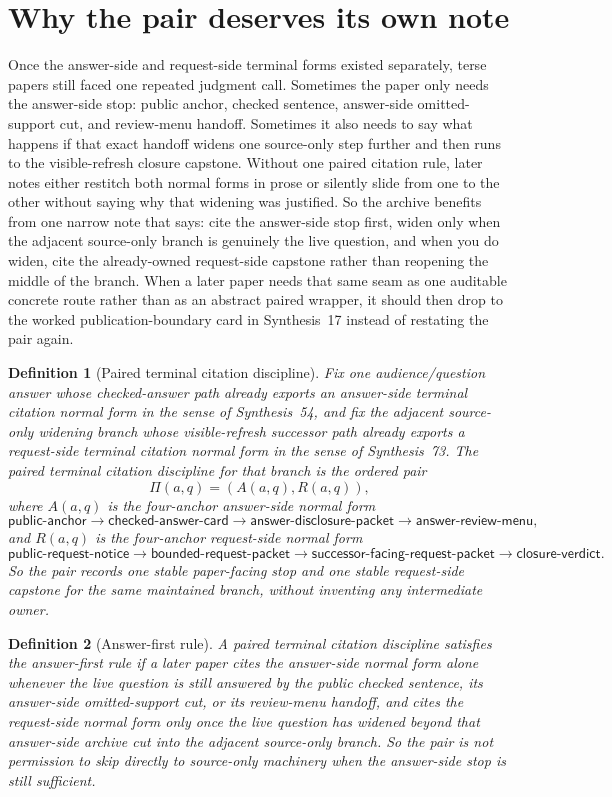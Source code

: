 \documentclass[11pt]{article}
\newtheorem{definition}{Definition}
\begin{document}
\section{Why the pair deserves its own note}
Once the answer-side and request-side terminal forms existed separately, terse papers still faced one repeated judgment call.
Sometimes the paper only needs the answer-side stop: public anchor, checked sentence, answer-side omitted-support cut, and review-menu handoff.
Sometimes it also needs to say what happens if that exact handoff widens one source-only step further and then runs to the visible-refresh closure capstone.
Without one paired citation rule, later notes either restitch both normal forms in prose or silently slide from one to the other without saying why that widening was justified.
So the archive benefits from one narrow note that says: cite the answer-side stop first, widen only when the adjacent source-only branch is genuinely the live question, and when you do widen, cite the already-owned request-side capstone rather than reopening the middle of the branch. When a later paper needs that same seam as one auditable concrete route rather than as an abstract paired wrapper, it should then drop to the worked publication-boundary card in Synthesis~17 instead of restating the pair again.

\begin{definition}[Paired terminal citation discipline]
Fix one audience/question answer whose checked-answer path already exports an answer-side terminal citation normal form in the sense of Synthesis~54, and fix the adjacent source-only widening branch whose visible-refresh successor path already exports a request-side terminal citation normal form in the sense of Synthesis~73.
The \emph{paired terminal citation discipline} for that branch is the ordered pair
\[
\Pi(a,q)=(A(a,q),R(a,q)),
\]
where \(A(a,q)\) is the four-anchor answer-side normal form
\[
\textsf{public-anchor} \to \textsf{checked-answer-card} \to \textsf{answer-disclosure-packet} \to \textsf{answer-review-menu},
\]
and \(R(a,q)\) is the four-anchor request-side normal form
\[
\textsf{public-request-notice} \to \textsf{bounded-request-packet} \to \textsf{successor-facing-request-packet} \to \textsf{closure-verdict}.
\]
So the pair records one stable paper-facing stop and one stable request-side capstone for the same maintained branch, without inventing any intermediate owner.
\end{definition}

\begin{definition}[Answer-first rule]
A paired terminal citation discipline satisfies the \emph{answer-first rule} if a later paper cites the answer-side normal form alone whenever the live question is still answered by the public checked sentence, its answer-side omitted-support cut, or its review-menu handoff, and cites the request-side normal form only once the live question has widened beyond that answer-side archive cut into the adjacent source-only branch.
So the pair is not permission to skip directly to source-only machinery when the answer-side stop is still sufficient.
\end{definition}
\end{document}
